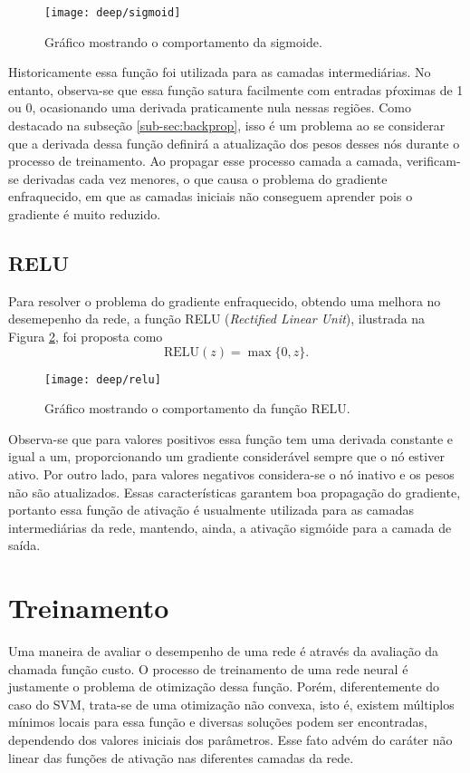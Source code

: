 \begin{figure}
\centering
\texttt{[image: deep/sigmoid]}
\caption{Gráfico mostrando o comportamento da sigmoide.}
\label{fig:sigmoid}
\end{figure}

Historicamente essa função foi utilizada para as camadas intermediárias. No entanto, observa-se que essa função satura facilmente com entradas pŕoximas de 1 ou 0, ocasionando uma derivada praticamente nula nessas regiões. Como destacado na subseção \ref{sub-sec:backprop}, isso é um problema ao se considerar que a derivada dessa função definirá a atualização dos pesos desses nós durante o processo de treinamento. Ao propagar esse processo camada a camada, verificam-se derivadas cada vez menores, o que causa o problema do gradiente enfraquecido, em que as camadas iniciais não conseguem aprender pois o gradiente é muito reduzido.

\subsection{RELU}
Para resolver o problema do gradiente enfraquecido, obtendo uma melhora no desemepenho da rede, a função RELU (\textit{Rectified Linear Unit}), ilustrada na Figura \ref{fig:relu}, foi proposta \cite{nair2010relu} como
\begin{equation}
	\label{eq:relu}
	\text{RELU}(z) = \max\{0,z\}.
\end{equation}

\begin{figure}
\centering
\texttt{[image: deep/relu]}
\caption{Gráfico mostrando o comportamento da função RELU.}
\label{fig:relu}
\end{figure}

Observa-se que para valores positivos essa função tem uma derivada constante e igual a um, proporcionando um gradiente considerável sempre que o nó estiver ativo. Por outro lado, para valores negativos considera-se o nó inativo e os pesos não são atualizados. Essas características garantem boa propagação do gradiente, portanto essa função de ativação é usualmente utilizada para as camadas intermediárias da rede, mantendo, ainda, a ativação sigmóide para a camada de saída.

\section{Treinamento}
Uma maneira de avaliar o desempenho de uma rede é através da avaliação da chamada função custo. O processo de treinamento de uma rede neural é justamente o problema de otimização dessa função. Porém, diferentemente do caso do SVM, trata-se de uma otimização não convexa, isto é, existem múltiplos mínimos locais para essa função e diversas soluções podem ser encontradas, dependendo dos valores iniciais dos parâmetros. Esse fato advém do caráter não linear das funções de ativação nas diferentes camadas da rede.

